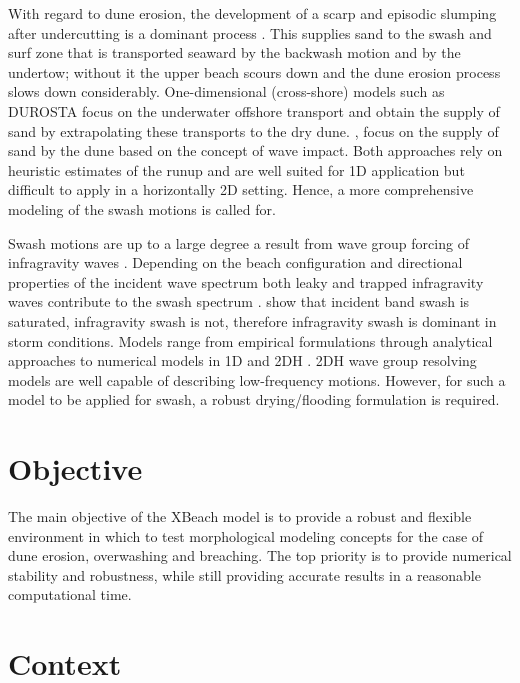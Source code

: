 With regard to dune erosion, the development of a scarp and episodic slumping after undercutting is a dominant process \citep{VanGent2008}. This supplies sand to the swash and surf zone that is transported seaward by the backwash motion and by the undertow; without it the upper beach scours down and the dune erosion process slows down considerably. One-dimensional (cross-shore) models such as DUROSTA \citep{Steetzel1993} focus on the underwater offshore transport and obtain the supply of sand by extrapolating these transports to the dry dune. \citet{OvertonFisher1988}, \citet{NishiKraus1996} focus on the supply of sand by the dune based on the concept of wave impact. Both approaches rely on heuristic estimates of the runup and are well suited for 1D application but difficult to apply in a horizontally 2D setting. Hence, a more comprehensive modeling of the swash motions is called for.

Swash motions are up to a large degree a result from wave group forcing of infragravity waves \citep{Tucker1954}. Depending on the beach configuration and directional properties of the incident wave spectrum both leaky and trapped infragravity waves contribute to the swash spectrum \citep{Huntley1981}. \citet{RaubenheimerGuza1996} show that incident band swash is saturated, infragravity swash is not, therefore infragravity swash is dominant in storm conditions. Models range from empirical formulations \citep[e.g.][]{Stockdon2006} through analytical approaches \citep{Schaeffer1994, Erikson2005} to numerical models in 1D \citep[e.g.][]{List1992, Roelvink1993b} and 2DH \citep[e.g.][]{VanDongeren2003, Reniers2004a, Reniers2006}. 2DH wave group resolving models are well capable of describing low-frequency motions. However, for such a model to be applied for swash, a robust drying/flooding formulation is required.

\section{Objective}

The main objective of the XBeach model is to provide a robust and flexible environment in which to test morphological modeling concepts for the case of dune erosion, overwashing and breaching. The top priority is to provide numerical stability and robustness, while still providing accurate results in a reasonable computational time.

\section{ Context}

